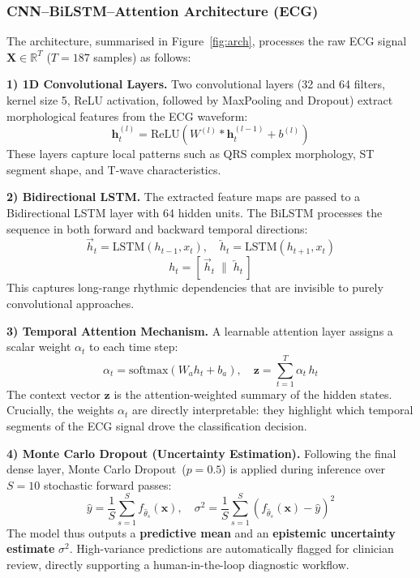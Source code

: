 \documentclass[10pt, twocolumn]{article}
\begin{document}
\subsubsection{CNN--BiLSTM--Attention Architecture (ECG)}

The architecture, summarised in Figure~\ref{fig:arch}, processes the raw ECG signal
$\mathbf{X} \in \mathbb{R}^T$ ($T = 187$ samples) as follows:

\textbf{1) 1D Convolutional Layers.}
Two convolutional layers (32 and 64 filters, kernel size 5, ReLU activation, followed by
MaxPooling and Dropout) extract morphological features from the ECG waveform:
\begin{equation}
  \mathbf{h}^{(l)}_t = \mathrm{ReLU}\!\left( W^{(l)} * \mathbf{h}^{(l-1)}_t + b^{(l)} \right)
\end{equation}
These layers capture local patterns such as QRS complex morphology, ST segment shape,
and T-wave characteristics.

\textbf{2) Bidirectional LSTM.}
The extracted feature maps are passed to a Bidirectional LSTM layer with 64 hidden units.
The BiLSTM processes the sequence in both forward and backward temporal directions:
\begin{equation}
  \overrightarrow{h}_t = \mathrm{LSTM}(h_{t-1}, x_t), \quad
  \overleftarrow{h}_t = \mathrm{LSTM}(h_{t+1}, x_t)
\end{equation}
\begin{equation}
  h_t = [\,\overrightarrow{h}_t \;\big\|\; \overleftarrow{h}_t\,]
\end{equation}
This captures long-range rhythmic dependencies that are invisible to purely convolutional
approaches.

\textbf{3) Temporal Attention Mechanism.}
A learnable attention layer assigns a scalar weight $\alpha_t$ to each time step:
\begin{equation}
  \alpha_t = \mathrm{softmax}(W_a h_t + b_a), \quad
  \mathbf{z} = \sum_{t=1}^{T} \alpha_t \, h_t
\end{equation}
The context vector $\mathbf{z}$ is the attention-weighted summary of the hidden states.
Crucially, the weights $\alpha_t$ are directly interpretable: they highlight which temporal
segments of the ECG signal drove the classification decision.

\textbf{4) Monte Carlo Dropout (Uncertainty Estimation).}
Following the final dense layer, Monte Carlo Dropout~($p = 0.5$) is applied during
inference over $S = 10$ stochastic forward passes:
\begin{equation}
  \hat{y} = \frac{1}{S}\sum_{s=1}^{S} f_{\hat{\theta}_s}(\mathbf{x}), \quad
  \sigma^2 = \frac{1}{S}\sum_{s=1}^{S} \left(f_{\hat{\theta}_s}(\mathbf{x}) - \hat{y}\right)^2
\end{equation}
The model thus outputs a \textbf{predictive mean} and an \textbf{epistemic uncertainty
estimate} $\sigma^2$.
High-variance predictions are automatically flagged for clinician review, directly
supporting a human-in-the-loop diagnostic workflow.
\end{document}
